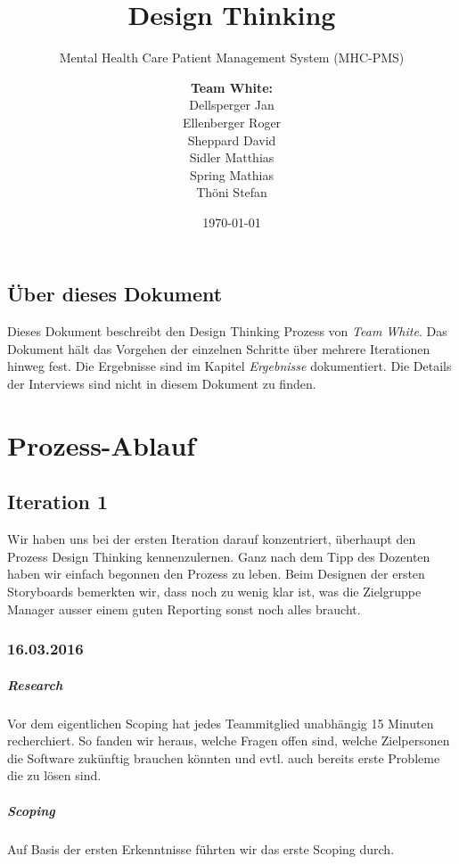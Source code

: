 \documentclass[a4paper]{scrreprt}
\title{Design Thinking}
\subtitle{Mental Health Care Patient Management System (MHC-PMS)}
\author{
\begin{tabular}{l}
\normalfont\bfseries{Team White:}\\
Dellsperger Jan\\
Ellenberger Roger\\
Sheppard David\\
Sidler Matthias\\
Spring Mathias\\
Thöni Stefan
\end{tabular}
}
\date{\today}
\begin{document}
\begin{titlepage}
	\maketitle
\end{titlepage}






\tableofcontents

\bigskip

\section*{Über dieses Dokument}
Dieses Dokument beschreibt den Design Thinking Prozess von \textit{Team White}. Das Dokument hält das Vorgehen der einzelnen Schritte über mehrere Iterationen hinweg fest. Die Ergebnisse sind im Kapitel \textit{Ergebnisse} dokumentiert. Die Details der Interviews sind nicht in diesem Dokument zu finden.

\chapter{Prozess-Ablauf}
\section{Iteration 1}
Wir haben uns bei der ersten Iteration darauf konzentriert, überhaupt den Prozess Design Thinking kennenzulernen. Ganz nach dem Tipp des Dozenten haben wir einfach begonnen den Prozess zu leben. Beim Designen der ersten Storyboards bemerkten wir, dass noch zu wenig klar ist, was die Zielgruppe Manager ausser einem guten Reporting sonst noch alles braucht.

\subsection*{16.03.2016}
\paragraph{Research}
Vor dem eigentlichen Scoping hat jedes Teammitglied unabhängig 15 Minuten recherchiert. So fanden wir heraus, welche Fragen offen sind, welche Zielpersonen die Software zukünftig brauchen könnten und evtl. auch bereits erste Probleme die zu lösen sind.


\paragraph{Scoping}
Auf Basis der ersten Erkenntnisse führten wir das erste Scoping durch.
\end{document}
